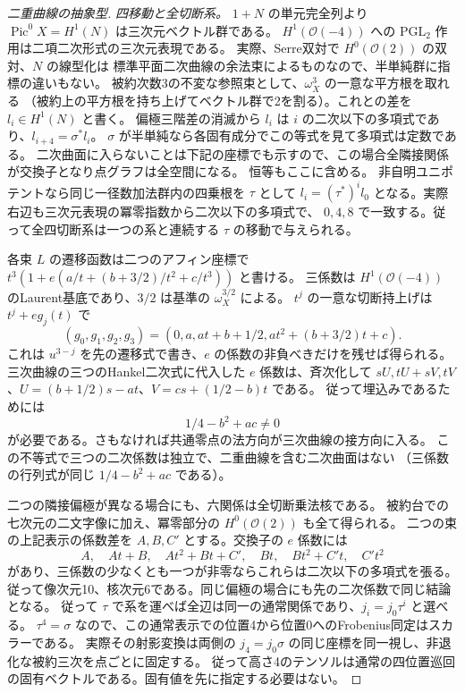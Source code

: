 \begin{proof}[二重曲線の抽象型]
\smallskip
\noindent\textit{四移動と全切断系。}
$1+N$ の単元完全列より $\operatorname{Pic}^0 X=H^1(N)$ は三次元ベクトル群である。
$H^1(\mathcal O(-4))$ への $\mathrm{PGL}_2$ 作用は二項二次形式の三次元表現である。
実際、Serre双対で $H^0(\mathcal O(2))$ の双対、$N$ の線型化は
標準平面二次曲線の余法束によるものなので、半単純群に指標の違いもない。
被約次数3の不変な参照束として、$\omega_X^3$ の一意な平方根を取れる
（被約上の平方根を持ち上げてベクトル群で2を割る）。これとの差を $l_i\in H^1(N)$ と書く。
偏極三階差の消滅から $l_i$ は $i$ の二次以下の多項式であり、$l_{i+4}=\sigma^*l_i$。
$\sigma$ が半単純なら各固有成分でこの等式を見て多項式は定数である。
二次曲面に入らないことは下記の座標でも示すので、この場合全隣接関係が交換子となり点グラフは全空間になる。
恒等もここに含める。
非自明ユニポテントなら同じ一径数加法群内の四乗根を $\tau$ として
$l_i=(\tau^*)^i l_0$ となる。実際右辺も三次元表現の冪零指数から二次以下の多項式で、
$0,4,8$ で一致する。従って全四切断系は一つの系と連続する $\tau$ の移動で与えられる。

各束 $L$ の遷移函数は二つのアフィン座標で
$t^3(1+e(a/t+(b+3/2)/t^2+c/t^3))$ と書ける。
三係数は $H^1(\mathcal O(-4))$ のLaurent基底であり、$3/2$ は基準の $\omega_X^{3/2}$ による。
$t^j$ の一意な切断持上げは $t^j+e g_j(t)$ で
\[
 (g_0,g_1,g_2,g_3)=(0,a,at+b+1/2,at^2+(b+3/2)t+c).
\]
これは $u^{3-j}$ を先の遷移式で書き、$e$ の係数の非負べきだけを残せば得られる。
三次曲線の三つのHankel二次式に代入した $e$ 係数は、斉次化して
$sU,tU+sV,tV$、$U=(b+1/2)s-at$、$V=cs+(1/2-b)t$ である。
従って埋込みであるためには
\[
                          1/4-b^2+ac\ne0
\]
が必要である。さもなければ共通零点の法方向が三次曲線の接方向に入る。
この不等式で三つの二次係数は独立で、二重曲線を含む二次曲面はない
（三係数の行列式が同じ $1/4-b^2+ac$ である）。

二つの隣接偏極が異なる場合にも、六関係は全切断乗法核である。
被約台での七次元の二文字像に加え、冪零部分の $H^0(\mathcal O(2))$ も全て得られる。
二つの束の上記表示の係数差を $A,B,C'$ とする。交換子の $e$ 係数には
\[
 A,\quad At+B,\quad At^2+Bt+C',\quad Bt,\quad Bt^2+C't,\quad C't^2
\]
があり、三係数の少なくとも一つが非零ならこれらは二次以下の多項式を張る。
従って像次元10、核次元6である。同じ偏極の場合にも先の二次係数で同じ結論となる。
従って $\tau$ で系を運べば全辺は同一の通常関係であり、$j_i=j_0\tau^i$ と選べる。
$\tau^4=\sigma$ なので、この通常表示での位置4から位置0へのFrobenius同定はスカラーである。
実際その射影変換は両側の $j_4=j_0\sigma$ の同じ座標を同一視し、非退化な被約三次を点ごとに固定する。
従って高さ4のテンソルは通常の四位置巡回の固有ベクトルである。固有値を先に指定する必要はない。


\end{proof}
